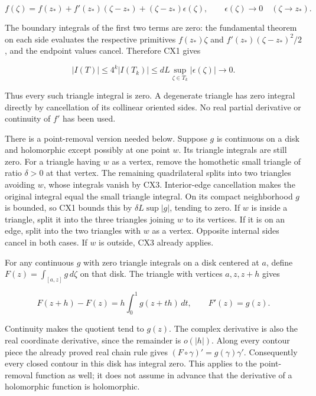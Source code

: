 \documentclass[
  11pt,
]{article}
\makeatletter
\let\ReaderOriginalAnchorStart\hyper@anchorstart
\let\ReaderOriginalAnchorEnd\hyper@anchorend
\let\ReaderPendingAliases\@empty
\def\ReaderArmAliases#1{\gdef\ReaderPendingAliases{#1}}
\def\hyper@anchorstart#1{\ReaderIfNativeAnchorTF{#1}{\ReaderPendingAliases\global\let\ReaderPendingAliases\@empty}{}\ReaderOriginalAnchorStart{#1}}
\makeatother
\begin{document}
\[
f(\zeta)=f(z_*)+f'(z_*)(\zeta-z_*)
                 +(\zeta-z_*)\epsilon(\zeta),\qquad
\epsilon(\zeta)\longrightarrow0\quad(\zeta\longrightarrow z_*).
\tag{CX2}
\]

The boundary integrals of the first two terms are zero: the fundamental
theorem on each side evaluates the respective primitives \(f(z_*)\zeta\)
and \(f'(z_*)(\zeta-z_*)^2/2\), and the endpoint values cancel.
Therefore CX1 gives

\[
|I(T)|\leq4^k|I(T_k)|
\leq dL\sup_{\zeta\in T_k}|\epsilon(\zeta)|
\longrightarrow0.
\tag{CX3}
\]

Thus every such triangle integral is zero. A degenerate triangle has
zero integral directly by cancellation of its collinear oriented sides.
No real partial derivative or continuity of \(f'\) has been used.

There is a point-removal version needed below. Suppose \(g\) is
continuous on a disk and holomorphic except possibly at one point \(w\).
Its triangle integrals are still zero. For a triangle having \(w\) as a
vertex, remove the homothetic small triangle of ratio \(\delta>0\) at
that vertex. The remaining quadrilateral splits into two triangles
avoiding \(w\), whose integrals vanish by CX3. Interior-edge
cancellation makes the original integral equal the small triangle
integral. On its compact neighborhood \(g\) is bounded, so CX1 bounds
this by \(\delta L\sup|g|\), tending to zero. If \(w\) is inside a
triangle, split it into the three triangles joining \(w\) to its
vertices. If it is on an edge, split into the two triangles with \(w\)
as a vertex. Opposite internal sides cancel in both cases. If \(w\) is
outside, CX3 already applies.

For any continuous \(g\) with zero triangle integrals on a disk centered
at \(a\), define \(F(z)=\int_{[a,z]}g\,d\zeta\) on that disk. The
triangle with vertices \(a,z,z+h\) gives

\[
F(z+h)-F(z)=h\int_0^1g(z+th)\,dt,\qquad F'(z)=g(z).
\tag{CX4}
\]

Continuity makes the quotient tend to \(g(z)\). The complex derivative
is also the real coordinate derivative, since the remainder is
\(o(|h|)\). Along every contour piece the already proved real chain rule
gives \((F\circ\gamma)'=g(\gamma)\gamma'\). Consequently every closed
contour in this disk has integral zero. This applies to the
point-removal function as well; it does not assume in advance that the
derivative of a holomorphic function is holomorphic.

\ReaderArmAliases{\ReaderOriginalAnchorStart{AN03-CN-COMPLEX-002}\ReaderOriginalAnchorEnd\begingroup\expandafter\def\csname @currentHref\endcsname{AN03-CN-COMPLEX-002}\label{AN03-CN-COMPLEX-002}\endgroup\ReaderOriginalAnchorStart{the-circle-formula-every-coefficient-and-both-continuation-principles}\ReaderOriginalAnchorEnd}
\end{document}
